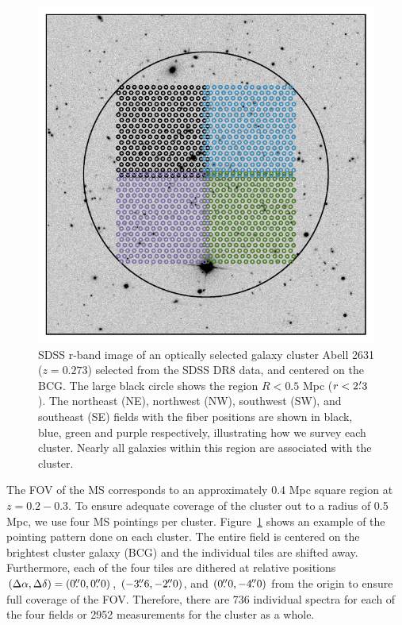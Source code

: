 \begin{figure}[!ht]
	\begin{center}
		\includegraphics[width=\textwidth]{./figures2/pointing.pdf} 
	\end{center}
	\caption[Basic properties of the ten galaxy clusters targeted with the MS.]{SDSS r-band image of an optically selected galaxy cluster Abell 2631 ($z=0.273$) selected from the SDSS DR8 data, and centered on the BCG. The large black circle shows the region $R<0.5$ Mpc ($r<2\mbox{\ensuremath{.\mkern-4mu^\prime}}3$). The northeast (NE), northwest (NW), southwest (SW), and southeast (SE) fields with the fiber positions are shown in black, blue, green and purple respectively, illustrating how we survey each cluster. Nearly all galaxies within this region are associated with the cluster.}
	\label{2fig:tiles} 
\end{figure}

The FOV of the MS corresponds to an approximately 0.4 Mpc square region at $z = 0.2-0.3$. To ensure adequate coverage of the cluster out to a radius of 0.5 Mpc, we use four MS pointings per cluster. Figure~\ref{2fig:tiles} shows an example of the pointing pattern done on each cluster. The entire field is centered on the brightest cluster galaxy (BCG) and the individual tiles are shifted away. Furthermore, each of the four tiles are dithered at relative positions $(\Delta \alpha, \Delta \delta)=(0\mbox{\ensuremath{.\!\!^{\prime\prime}}}0,0\mbox{\ensuremath{.\!\!^{\prime\prime}}}0)$, $(-3\mbox{\ensuremath{.\!\!^{\prime\prime}}}6,-2\mbox{\ensuremath{.\!\!^{\prime\prime}}}0)$, and $(0\mbox{\ensuremath{.\!\!^{\prime\prime}}}0, -4\mbox{\ensuremath{.\!\!^{\prime\prime}}}0)$ from the origin to ensure full coverage of the FOV. Therefore, there are 736 individual spectra for each of the four fields or 2952 measurements for the cluster as a whole.


